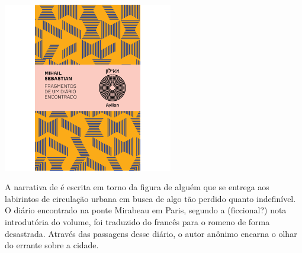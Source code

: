 \vfill

\hspace*{-.4cm}\begin{minipage}[c]{.5\linewidth}
\small{
{}}
\end{minipage}


\pagebreak %

\begin{center}
\hspace*{-3.6cm}
\hspace*{3.1cm}\includegraphics[width=74mm]{./grid/sebastian.jpg}
\end{center}

\hspace*{-7cm}\hrulefill\hspace*{-7cm}

\medskip

\noindent{}A narrativa de {} é escrita em torno da figura de alguém que se entrega aos labirintos de circulação urbana em busca de algo tão perdido quanto indefinível. O diário encontrado na ponte Mirabeau em Paris, segundo a (ficcional?) nota introdutória do volume, foi traduzido do francês para o romeno de forma desastrada. Através das passagens desse diário, o autor anônimo encarna o olhar do errante sobre a cidade.


